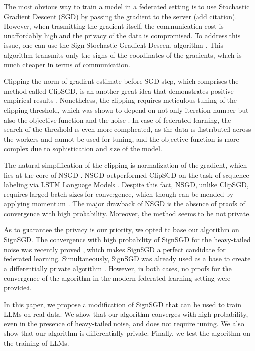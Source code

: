\documentclass[12pt]{article}
\newcommand{\algname}[1]{{\sf  #1}\xspace}
\begin{document}
The most obvious way to train a model in a federated setting is to use Stochastic Gradient Descent (\algname{SGD}) \parencite{Robbins1951} by passing the gradient to the server (add citation). However, when trasmitting the gradient itself, the communication cost is unaffordably high and the privacy of the data is compromised. To address this issue, one can use the Sign Stochastic Gradient Descent algorithm \parencite{Bernstein2018}. This algorithm transmits only the signs of the coordinates of the gradients, which is much cheaper in terms of communication.

Clipping the norm of gradient estimate before \algname{SGD} step, which comprises the method called \algname{ClipSGD}, is an another great idea that demonstrates positive empirical results \parencite{Pascanu2013, Goodfellow2016}. Nonetheless, the clipping requires meticulous tuning of the clipping threshold, which was shown to depend on not only iteration number but also the objective function and the noise \parencite[Theorem $3.1$]{Sadiev2023}. In case of federated learning, the search of the threshold is even more complicated, as the data is distributed across the workers and cannot be used for tuning, and the objective function is more complex due to sophistication and size of the model.

The natural simplification of the clipping is normalization of the gradient, which lies at the core of \algname{NSGD} \parencite{Hazan2015}. \algname{NSGD} outperformed \algname{ClipSGD} on the task of sequence labeling via LSTM Language Models \cite{Merity2017}. Despite this fact, \algname{NSGD}, unlike \algname{ClipSGD}, requires larged batch sizes for convergence, which though can be mended by applying momentum \cite{Cutkosky2020}. The major drawback of \algname{NSGD} is the absence of proofs of convergence with high probability. Moreover, the method seems to be not private.

As to guarantee the privacy is our priority, we opted to base our algorithm on \algname{SignSGD}. The convergence with high probability of \algname{SignSGD} for the heavy-tailed noise was recently proved \parencite{Kornilov2025}, which makes \algname{SignSGD} a perfect candidate for federated learning. Simultaneously, \algname{SignSGD} was already used as a base to create a differentially private algorithm \parencite{Jin2020}. However, in both cases, no proofs for the convergence of the algorithm in the modern federated learning setting were provided.

In this paper, we propose a modification of \algname{SignSGD} that can be used to train LLMs on real data. We show that our algorithm converges with high probability, even in the presence of heavy-tailed noise, and does not require tuning. We also show that our algorithm is differentially private. Finally, we test the algorithm on the training of LLMs.
\end{document}

